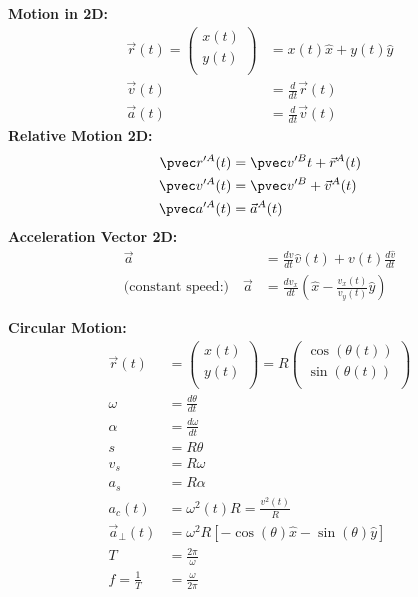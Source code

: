 \newpage
\begin{importantEquations}
\begin{multicols}{2}
\textbf{Motion in 2D:}
\begin{align*}
\vec r(t) = \begin{pmatrix}
          x(t) \\
          y(t) \\
        \end{pmatrix}&= x(t) \hat x + y(t) \hat y\\
\vec v(t) &=\frac{d}{dt}\vec r(t)\\
\vec a(t) &= \frac{d}{dt}\vec v(t)
\end{align*}
\textbf{Relative Motion 2D:}
\begin{align*}
\pvec r'^A(t) &= \pvec v'^Bt+\vec r^A(t)\\
\pvec v'^A(t) &=\pvec v'^B+\vec v^A(t)\\
\pvec a'^A(t)&=\vec a^A(t)
\end{align*}
\textbf{Acceleration Vector 2D:}
\begin{align*}
\vec a&=\frac{dv}{dt}\hat v(t)+v(t)\frac{d\hat v}{dt}\\
\textrm{(constant speed:)} \quad \vec a&=\frac{dv_x}{dt} \left(\hat x - \frac{v_x(t)}{v_y(t)}\hat y\right) 
\end{align*}
\columnbreak

\textbf{Circular Motion:}
\begin{align*}
\vec r(t)&= \begin{pmatrix}
          x(t) \\
          y(t) \\
        \end{pmatrix}
        =R \begin{pmatrix}
          \cos(\theta(t)) \\
          \sin(\theta(t)) \\
        \end{pmatrix}\\
\omega &= \frac{d\theta}{dt}\\
\alpha &= \frac{d\omega}{dt}\\
s&=R\theta\\
v_s&=R\omega\\
a_s&=R\alpha\\
a_c(t) &= \omega^2(t)R = \frac{v^2(t)}{R}\\
\vec a_{\bot}(t)&=\omega^2 R[-\cos(\theta)\hat x-\sin(\theta)\hat y]\\
T&=\frac{2\pi}{\omega}\\
f=\frac{1}{T}&=\frac{\omega}{2\pi}
\end{align*}
\end{multicols}
\end{importantEquations}


